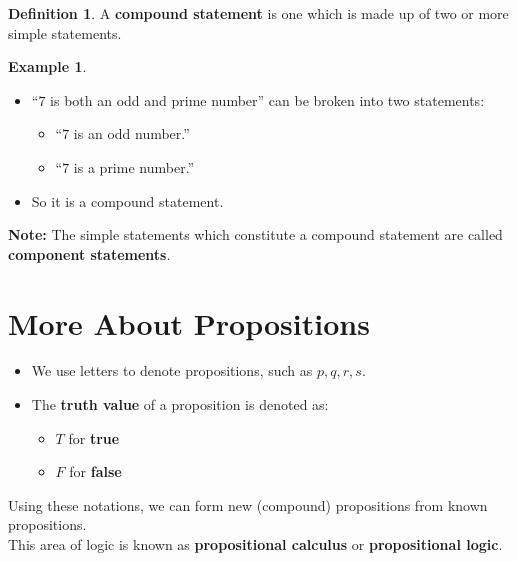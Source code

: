 \documentclass[
]{book}
\providecommand{\tightlist}{%
  \setlength{\itemsep}{0pt}\setlength{\parskip}{0pt}}
\theoremstyle{definition}
\newtheorem{definition}{Definition}[chapter]
\theoremstyle{definition}
\newtheorem{example}{Example}[chapter]
\theoremstyle{definition}
\theoremstyle{definition}
\theoremstyle{remark}
\begin{document}
\begin{definition}
\protect\hypertarget{def:unnamed-chunk-9}{}\label{def:unnamed-chunk-9}A \textbf{compound statement} is one which is made up of two or more simple statements.
\end{definition}

\begin{example}
\protect\hypertarget{exm:unnamed-chunk-10}{}\label{exm:unnamed-chunk-10}\leavevmode

\begin{itemize}
\tightlist
\item
  ``\(7\) is both an odd and prime number'' can be broken into two statements:

  \begin{itemize}
  \tightlist
  \item
    ``\(7\) is an odd number.''
  \item
    ``\(7\) is a prime number.''\\
  \end{itemize}
\item
  So it is a compound statement.
\end{itemize}

\end{example}

\textbf{Note:} The simple statements which constitute a compound statement are called \textbf{component statements}.

\section{More About Propositions}\label{more-about-propositions}

\begin{itemize}
\tightlist
\item
  We use letters to denote propositions, such as \(p, q, r, s\).
\item
  The \textbf{truth value} of a proposition is denoted as:

  \begin{itemize}
  \tightlist
  \item
    \(T\) for \textbf{true}
  \item
    \(F\) for \textbf{false}
  \end{itemize}
\end{itemize}

Using these notations, we can form new (compound) propositions from known propositions.\\
This area of logic is known as \textbf{propositional calculus} or \textbf{propositional logic}.
\end{document}
